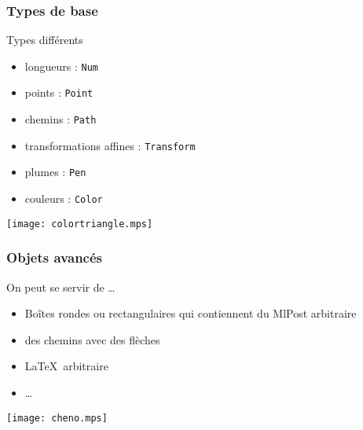 \documentclass[nodefaultblocks]{beamer}
\begin{document}
\begin{frame}\frametitle{Types de base}

  \begin{block}{Types différents}
    \begin{itemize}
      \item longueurs : {\tt Num}
      \item points : {\tt Point}
      \item chemins : {\tt Path}
      \item transformations affines : {\tt Transform}
      \item plumes : {\tt Pen}
      \item couleurs : {\tt Color}
    \end{itemize}
  \end{block}

  \begin{center}
    \texttt{[image: colortriangle.mps]}
  \end{center}
  
\end{frame}

\begin{frame}\frametitle{Objets avancés}
  \begin{block}{On peut se servir de \dots}
    \begin{itemize}
      \item Boîtes rondes ou rectangulaires qui contiennent du MlPost
        arbitraire
      \item des chemins avec des flèches
      \item \LaTeX\ arbitraire 
      \item \dots 
    \end{itemize}
  \end{block}
  \bigskip
  \begin{center}
    \texttt{[image: cheno.mps]}
  \end{center}
  
\end{frame}
\end{document}
